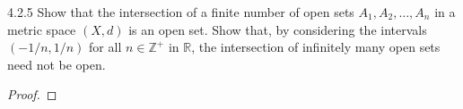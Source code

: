 \begin{problem}{4.2.5}
  Show that the intersection of a finite number of open sets $A_1, A_2, \dots, A_n$
  in a metric space $(X, d)$ is an open set. Show that, by considering the intervals
  $(-1/n, 1/n)$ for all $n \in \mathbb{Z}^+$ in $\mathbb{R}$, the intersection of infinitely
  many open sets need not be open.
\end{problem}

\begin{proof}
\end{proof}
\newpage
